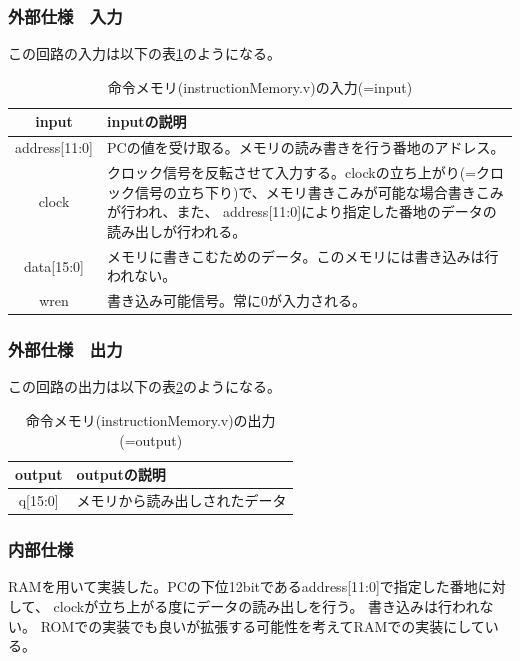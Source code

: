 \documentclass[a4j,titlepage]{jarticle}
\begin{document}
\subsubsection{外部仕様　入力}
この回路の入力は以下の表\ref{instructionMemoryI}のようになる。
\begin{table}[H]
    \caption{命令メモリ(instructionMemory.v)の入力(=input)}
    \label{instructionMemoryI}
    \begin{center}
    \begin {tabularx}{150mm}{|c|X|} \hline
         input & inputの説明 \\ \hline \hline
         address[11:0] & PCの値を受け取る。メモリの読み書きを行う番地のアドレス。\\ \hline
         clock & クロック信号を反転させて入力する。clockの立ち上がり(=クロック信号の立ち下り)で、メモリ書きこみが可能な場合書きこみが行われ、また、
         address[11:0]により指定した番地のデータの読み出しが行われる。 \\ \hline 
         data[15:0] & メモリに書きこむためのデータ。このメモリには書き込みは行われない。\\ \hline
         wren & 書き込み可能信号。常に0が入力される。\\ \hline
    \end{tabularx}
    \end{center}
\end{table}

\subsubsection{外部仕様　出力}
この回路の出力は以下の表\ref{instructionMemoryO}のようになる。
\begin{table}[H]
    \caption{命令メモリ(instructionMemory.v)の出力(=output)}
    \label{instructionMemoryO}
    \begin{center}
    \begin {tabularx}{150mm}{|c|X|} \hline
         output & outputの説明 \\ \hline \hline
         q[15:0] & メモリから読み出しされたデータ\\ \hline
    \end {tabularx}
    \end{center}
\end{table}

\subsubsection{内部仕様}
RAMを用いて実装した。PCの下位12bitであるaddress[11:0]で指定した番地に対して、
clockが立ち上がる度にデータの読み出しを行う。
書き込みは行われない。
ROMでの実装でも良いが拡張する可能性を考えてRAMでの実装にしている。
\end{document}
